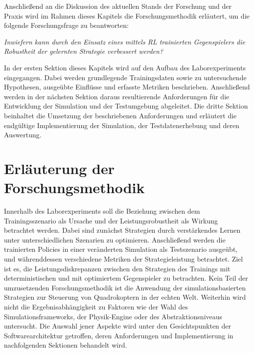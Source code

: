 Anschließend an die Diskussion des aktuellen Stands der Forschung und der Praxis wird im Rahmen dieses Kapitels die Forschungsmethodik erläutert, um die folgende Forschungsfrage zu beantworten:

\textit{Inwiefern kann durch den Einsatz eines mittels RL trainierten Gegenspielers die Robustheit der gelernten Strategie verbessert werden?}


In der ersten Sektion dieses Kapitels wird auf den Aufbau des Laborexperiments eingegangen.
Dabei werden grundlegende Trainingsdaten sowie zu untersuchende Hypothesen, ausgeübte Einflüsse und erfasste Metriken beschrieben.
Anschließend werden in der nächsten Sektion daraus resultierende Anforderungen für die Entwicklung der Simulation und der Testumgebung abgeleitet. 
Die dritte Sektion beinhaltet die Umsetzung der beschriebenen Anforderungen und erläutert die endgültige Implementierung der Simulation, der Testdatenerhebung und deren Auswertung.

\section{Erläuterung der Forschungsmethodik}

Innerhalb des Laborexperiments soll die Beziehung zwischen dem Trainingsszenario als Ursache und der Leistungsrobustheit als Wirkung betrachtet werden.
Dabei sind zunächst Strategien durch verstärkendes Lernen unter unterschiedlichen Szenarien zu optimieren. 
Anschließend werden die trainierten Policies in einer veränderten Simulation als Testszenario ausgeübt, und währenddessen verschiedene Metriken der Strategieleistung betrachtet.
Ziel ist es, die Leistungsdiskrepanzen zwischen den Strategien des Trainings mit deterministischen und mit optimiertem Gegenspieler zu betrachten.
Kein Teil der umzusetzenden Forschungsmethodik ist die Anwendung der simulationsbasierten Strategien zur Steuerung von Quadrokoptern in der echten Welt. 
Weiterhin wird nicht die Ergebnisabhängigkeit zu Faktoren wie der Wahl des Simulationsframeworks, der Physik-Engine oder des Abstraktionsniveaus untersucht.
Die Auswahl jener Aspekte wird unter den Gesichtspunkten der Softwarearchitektur getroffen, deren Anforderungen und Implementierung in nachfolgenden Sektionen behandelt wird.

